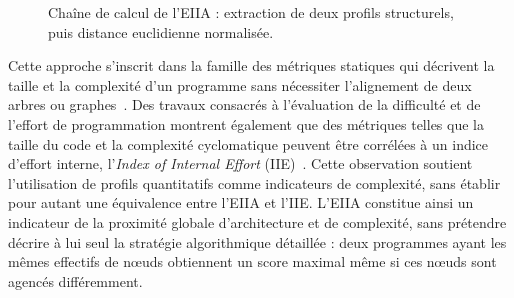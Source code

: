 {\begin{figure}[htbp]
\centering
{}%
\caption{Chaîne de calcul de l'EIIA : extraction de deux profils structurels,
puis distance euclidienne normalisée.}
\label{fig:eiia}
\end{figure}

Cette approche s'inscrit dans la famille des métriques statiques qui décrivent
la taille et la complexité d'un programme sans nécessiter l'alignement de deux
arbres ou graphes~\cite{TODO_ref3}. Des travaux consacrés à l'évaluation de la
difficulté et de l'effort de programmation montrent également que des
métriques telles que la taille du code et la complexité cyclomatique peuvent
être corrélées à un indice d'effort interne, l'\emph{Index of Internal Effort}
(IIE)~\cite{TODO_ref4}. Cette observation soutient l'utilisation de profils
quantitatifs comme indicateurs de complexité, sans établir pour autant une
équivalence entre l'EIIA et l'IIE. L'EIIA constitue ainsi un indicateur de la
proximité globale d'architecture et de complexité, sans prétendre décrire à
lui seul la stratégie algorithmique détaillée : deux programmes ayant les
mêmes effectifs de nœuds obtiennent un score maximal même si ces nœuds sont
agencés différemment.

}
